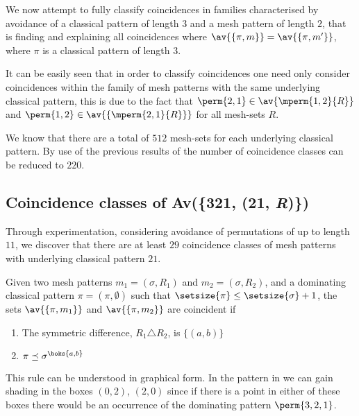 We now attempt to fully classify coincidences in families characterised by avoidance
of a classical pattern of length \(3\) and a mesh pattern of length \(2\), that is
finding and explaining all coincidences where \(\av{\{\pi,m\}} = \av{\{\pi,m^\prime\}}\),
where \(\pi\) is a classical pattern of length \(3\).

It can be easily seen that in order to classify coincidences one need only
consider coincidences within the family of mesh patterns with the same underlying
classical pattern, this is due to the fact that \(\perm{2,1}\in\av{\mperm{1,2}{R}}\)
and \(\perm{1,2}\in\av{\{\mperm{2,1}{R}\}}\) for all mesh-sets \(R\).

We know that there are a total of \(512\) mesh-sets for each underlying classical
pattern. By use of the previous results of \textcite{DBLP:journals/corr/ClaessonTU14}
the number of coincidence classes can be reduced to \(220\).

\subsection{Coincidence classes of Av(\{321, (21, \textit{R})\})}
Through experimentation, considering avoidance of permutations of up to length \(11\), we discover
that there are at least \(29\) coincidence classes of mesh patterns with underlying classical
pattern \(21\).

\begin{proposition}
    \label{prop:dom1}
    Given two mesh patterns \(m_1 =(\sigma, R_1)\) and \(m_2 = (\sigma, R_2)\),
    and a dominating classical pattern \(\pi = (\pi,\emptyset)\) such that
    \(\setsize{\pi} \le \setsize{\sigma} + 1\), the sets \(\av{\{\pi,m_1\}}\) and
    \(\av{\{\pi,m_2\}}\) are coincident if

    \begin{enumerate}
        \item The symmetric difference, \(R_1 \triangle R_2\), is \(\{(a,b)\}\)
        \item \(\pi \preceq \sigma^\boks{a,b}\)\label{prop:dom1:cont}
    \end{enumerate}
\end{proposition}

This rule can be understood in graphical form. In the pattern in
 we can gain shading in the boxes \((0,2)\), \((2,0)\)
since if there is a point in either of these boxes there would be an occurrence of
the dominating pattern \(\perm{3,2,1}\).

